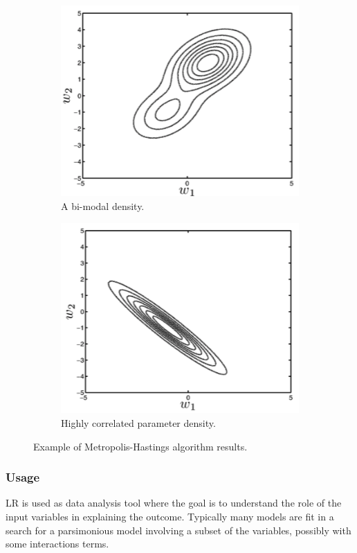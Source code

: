 \documentclass[12pt, letterpaper]{article}
\theoremstyle{definition}
\begin{document}
\begin{figure}
\begin{subfigure}{.5\textwidth}
\centering
\includegraphics[width=.8\linewidth]{img/mode1}
\caption{A bi-modal density.}
\label{mode1}
\end{subfigure}
\begin{subfigure}{.5\textwidth}
\centering
\includegraphics[width=.8\linewidth]{img/mode2}
\caption{Highly correlated parameter density.}
\label{mode2}
\end{subfigure}
\caption{Example of Metropolis-Hastings algorithm results.}
\end{figure}

\subsubsection{Usage}
LR is used as data analysis tool where the goal is to  understand the role of the input variables in explaining the outcome. Typically many models are fit in a search for a parsimonious model involving a subset of the variables, possibly with some interactions terms. 
\end{document}
